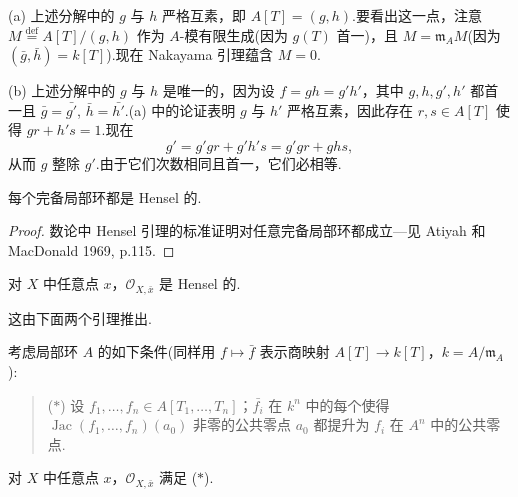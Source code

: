 \begin{remark}\label{rem:4.3}
(a) 上述分解中的 $g$ 与 $h$ 严格互素，即 $A[T] = (g, h)$.要看出这一点，注意 $M \overset{\mathrm{def}}{=} A[T]/(g, h)$ 作为 $A$-模有限生成(因为 $g(T)$ 首一)，且 $M = \mathfrak{m}_{A}M$(因为 $(\bar{g}, \bar{h}) = k[T]$).现在 Nakayama 引理蕴含 $M = 0$.

(b) 上述分解中的 $g$ 与 $h$ 是唯一的，因为设 $f = gh = g'h'$，其中 $g, h, g', h'$ 都首一且 $\bar{g} = \bar{g'}$, $\bar{h} = \bar{h'}$.(a) 中的论证表明 $g$ 与 $h'$ 严格互素，因此存在 $r, s \in A[T]$ 使得 $gr + h's = 1$.现在
\[
g' = g'gr + g'h's = g'gr + ghs,
\]
从而 $g$ 整除 $g'$.由于它们次数相同且首一，它们必相等.
\end{remark}

\begin{theorem}\label{thm:4.4}
每个完备局部环都是 Hensel 的.
\end{theorem}

\begin{proof}
数论中 Hensel 引理的标准证明对任意完备局部环都成立---见 Atiyah 和 MacDonald 1969, p.115.
\end{proof}

\begin{theorem}\label{thm:4.5}
对 $X$ 中任意点 $x$，$\mathcal{O}_{X, \bar{x}}$ 是 Hensel 的.
\end{theorem}

这由下面两个引理推出.

考虑局部环 $A$ 的如下条件(同样用 $f \mapsto \bar{f}$ 表示商映射 $A[T] \to k[T]$，$k = A/\mathfrak{m}_{A}$):

\begin{quote}
($\ast$) 设 $f_1, \ldots, f_n \in A[T_1, \ldots, T_n]$；$\bar{f_i}$ 在 $k^{n}$ 中的每个使得 $\operatorname{Jac}(f_1, \ldots, f_n)(a_0)$ 非零的公共零点 $a_0$ 都提升为 $f_i$ 在 $A^{n}$ 中的公共零点.
\end{quote}

\begin{lemma}\label{lem:4.6}
对 $X$ 中任意点 $x$，$\mathcal{O}_{X, \bar{x}}$ 满足 ($\ast$).
\end{lemma}

